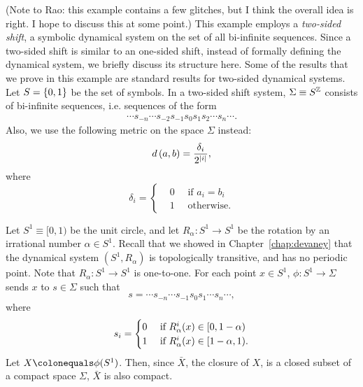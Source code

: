 \documentclass[10pt,twoside,draft]{book}
\begin{document}
\begin{example}
  \citep{blanchard}
  (Note to Rao: this example contains a few glitches, but I think the overall idea is right. I hope to discuss this at some point.)
  This example employs a \textit{two-sided shift}, a symbolic dynamical system on the set of all bi-infinite sequences.
  Since a two-sided shift is similar to an one-sided shift, instead of formally defining the dynamical system, we briefly discuss its structure here.
  Some of the results that we prove in this example are standard results for two-sided dynamical systems.
  Let $S = \left \{ 0,1 \right \}$ be the set of symbols.
  In a two-sided shift system, $\Sigma \equiv S^{\mathbb{Z}}$ consists of bi-infinite sequences, i.e. sequences of the form
  \begin{align*}
    \cdots s_{-n} \cdots s_{-2} s_{-1} s_0 s_1 s_2 \cdots s_n \cdots.
  \end{align*}
  Also, we use the following metric on the space $\Sigma$ instead:
  \begin{equation*}
    d\left( a,b \right) = \frac{\delta_i}{2^{\left | i \right |}},
  \end{equation*}
  where
  \begin{equation*}
    \delta_i = 
    \begin{cases}
      &0 \quad \mbox{ if } a_i = b_i  \\
      &1 \quad \mbox{ otherwise.}
    \end{cases}
\end{equation*}

  Let $S^1 \equiv [0, 1)$ be the unit circle, and let $R_\alpha: S^1 \to S^1$ be the rotation by an irrational number $\alpha \in S^1$. %
  Recall that we showed in Chapter~\ref{chap:devaney} that the dynamical system $(S^1, R_\alpha)$ is topologically transitive, and has no periodic point.
  Note that $R_\alpha: S^1 \to S^1$ is one-to-one.
  For each point $x \in S^1$, $\phi: S^1 \to \Sigma$ sends $x$ to $s \in \Sigma$ such that
  \begin{equation*}
    s = \cdots s_{-n} \cdots s_{-1} s_0 s_1 \cdots s_n \cdots,
  \end{equation*}
  where
  \begin{equation*}
    s_i = \begin{cases}
      0& \mbox{ if } \itr{R_\alpha}{i}(x) \in [0, 1-\alpha)  \\
      1& \mbox{ if } \itr{R_\alpha}{i}(x) \in [1-\alpha, 1). %
    \end{cases}
  \end{equation*}
  Let $X \ceq \phi(S^1)$.
  Then, since $\bar{X}$, the closure of $X$, is a closed subset of a compact space $\Sigma$, $\bar{X}$ is also compact.


\end{example}
\end{document}
